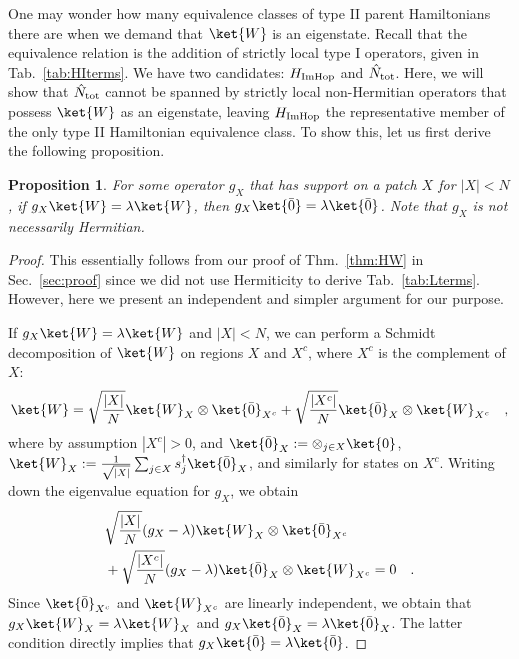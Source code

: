 \documentclass[prx,letterpaper,aps,superscriptaddress,floatfix,twocolumn,nofootinbib]{revtex4-2}
\newtheorem{prop}{Proposition}
\theoremstyle{definition}
\begin{document}
%
One may wonder how many equivalence classes of type II parent Hamiltonians there are when we demand that $\ket{W}$ is an eigenstate.
%
Recall that the equivalence relation is the addition of strictly local type I operators, given in Tab.~\ref{tab:HIterms}.
%
We have two candidates: $H_{\rm ImHop}$ and $\hat{N}_{\rm tot}$.
%
Here, we will show that $\hat{N}_{\rm tot}$ cannot be spanned by strictly local non-Hermitian operators that possess $\ket{W}$ as an eigenstate, leaving $H_{\rm ImHop}$ the representative member of the only type II Hamiltonian equivalence class.
%
To show this, let us first derive the following proposition.
\begin{prop}
    \label{prop:HXdegW0}
    For some operator $g_X$ that has support on a patch $X$ for $|X| < N$, if $g_X \ket{W} = \lambda \ket{W}$, then $g_X \ket{\bar{0}}=\lambda\ket{\bar{0}}$. 
    Note that $g_X$ is not necessarily Hermitian.
\end{prop}
\begin{proof}
%
    This essentially follows from our proof of Thm.~\ref{thm:HW} in Sec.~\ref{sec:proof} since we did not use Hermiticity to derive Tab.~\ref{tab:Lterms}.
    However, here we present an independent and simpler argument for our purpose.

    If $g_X\ket{W} = \lambda \ket{W}$ and $|X| < N$, we can perform a Schmidt decomposition of $\ket{W}$ on regions $X$ and $X^c$, where $X^c$ is the complement of $X$:
    \begin{equation}
    \ket{W}=\sqrt{\frac{|X|}{N}}\ket{W}_X\otimes\ket{\bar{0}}_{X^c}+\sqrt{\frac{|X^c|}{N}}\ket{\bar{0}}_X\otimes\ket{W}_{X^c}\quad,
    \label{eq:WSchmidt}
    \end{equation}
    where by assumption $|X^c|>0$, and $\ket{\bar{0}}_X:=\otimes_{j\in X}\ket{0}$, $\ket{W}_X:=\frac{1}{\sqrt{|X|}}\sum_{j\in X} s_j^\dag\ket{\bar{0}}_X$, and similarly for states on $X^c$.
    Writing down the eigenvalue equation for $g_X$, we obtain
    \begin{align}
        &\sqrt{\frac{|X|}{N}} (g_X - \lambda)\ket{W}_X \otimes \ket{\bar{0}}_{X^c} \nonumber\\
        &+ \sqrt{\frac{|X^c|}{N}} (g_X - \lambda)\ket{\bar{0}}_X \otimes \ket{W}_{X^c}= 0\quad.
    \end{align}
    Since $\ket{\bar{0}}_{X^c}$ and $\ket{W}_{X^c}$ are linearly independent, we obtain that $g_X \ket{W}_X = \lambda\ket{W}_X$ and $g_X\ket{\bar{0}}_X = \lambda\ket{\bar{0}}_X$.
    The latter condition directly implies that $g_X \ket{\bar{0}} = \lambda \ket{\bar{0}}$. 
\end{proof}
\end{document}
